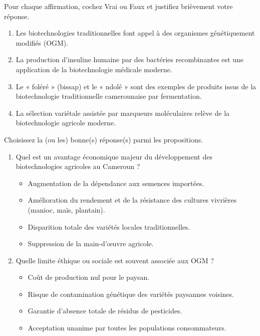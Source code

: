 \documentclass[11pt]{article}
\begin{document}
\begin{exercice}
Pour chaque affirmation, cochez Vrai ou Faux et justifiez brièvement votre réponse.
\begin{enumerate}
    \item Les biotechnologies traditionnelles font appel à des organismes génétiquement modifiés (OGM).
    \item La production d'insuline humaine par des bactéries recombinantes est une application de la biotechnologie médicale moderne.
    \item Le « foléré » (bissap) et le « ndolé » sont des exemples de produits issus de la biotechnologie traditionnelle camerounaise par fermentation.
    \item La sélection variétale assistée par marqueurs moléculaires relève de la biotechnologie agricole moderne.
\end{enumerate}
\end{exercice}

\begin{exercice}
Choisissez la (ou les) bonne(s) réponse(s) parmi les propositions.
\begin{enumerate}
    \item Quel est un avantage économique majeur du développement des biotechnologies agricoles au Cameroun ?
    \begin{itemize}
        \item[A.] Augmentation de la dépendance aux semences importées.
        \item[B.] Amélioration du rendement et de la résistance des cultures vivrières (manioc, maïs, plantain).
        \item[C.] Disparition totale des variétés locales traditionnelles.
        \item[D.] Suppression de la main-d'œuvre agricole.
    \end{itemize}
    \item Quelle limite éthique ou sociale est souvent associée aux OGM ?
    \begin{itemize}
        \item[A.] Coût de production nul pour le paysan.
        \item[B.] Risque de contamination génétique des variétés paysannes voisines.
        \item[C.] Garantie d'absence totale de résidus de pesticides.
        \item[D.] Acceptation unanime par toutes les populations consommateurs.
    \end{itemize}
\end{enumerate}
\end{exercice}
\end{document}
